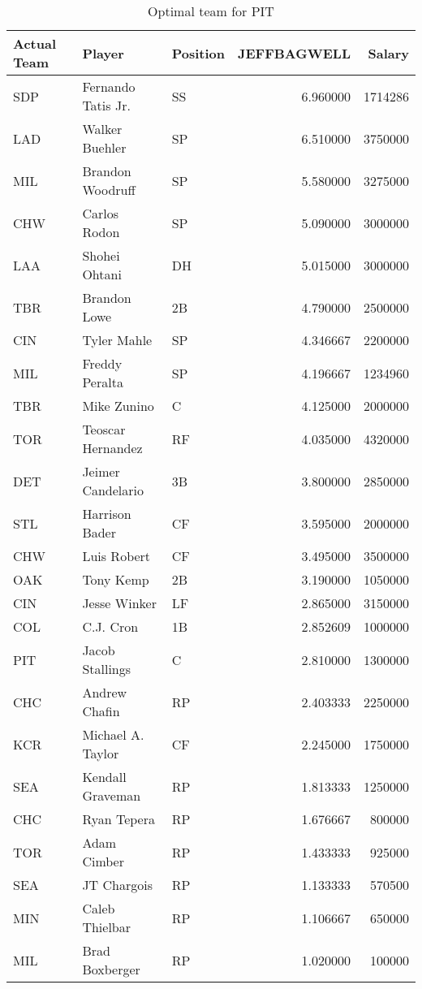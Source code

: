 \begin{table}

\caption{Optimal team for PIT}
\centering
\begin{tabular}[t]{l|l|l|r|r}
\hline
Actual Team & Player & Position & JEFFBAGWELL & Salary\\
\hline
SDP & Fernando Tatis Jr. & SS & 6.960000 & 1714286\\
\hline
LAD & Walker Buehler & SP & 6.510000 & 3750000\\
\hline
MIL & Brandon Woodruff & SP & 5.580000 & 3275000\\
\hline
CHW & Carlos Rodon & SP & 5.090000 & 3000000\\
\hline
LAA & Shohei Ohtani & DH & 5.015000 & 3000000\\
\hline
TBR & Brandon Lowe & 2B & 4.790000 & 2500000\\
\hline
CIN & Tyler Mahle & SP & 4.346667 & 2200000\\
\hline
MIL & Freddy Peralta & SP & 4.196667 & 1234960\\
\hline
TBR & Mike Zunino & C & 4.125000 & 2000000\\
\hline
TOR & Teoscar Hernandez & RF & 4.035000 & 4320000\\
\hline
DET & Jeimer Candelario & 3B & 3.800000 & 2850000\\
\hline
STL & Harrison Bader & CF & 3.595000 & 2000000\\
\hline
CHW & Luis Robert & CF & 3.495000 & 3500000\\
\hline
OAK & Tony Kemp & 2B & 3.190000 & 1050000\\
\hline
CIN & Jesse Winker & LF & 2.865000 & 3150000\\
\hline
COL & C.J. Cron & 1B & 2.852609 & 1000000\\
\hline
PIT & Jacob Stallings & C & 2.810000 & 1300000\\
\hline
CHC & Andrew Chafin & RP & 2.403333 & 2250000\\
\hline
KCR & Michael A. Taylor & CF & 2.245000 & 1750000\\
\hline
SEA & Kendall Graveman & RP & 1.813333 & 1250000\\
\hline
CHC & Ryan Tepera & RP & 1.676667 & 800000\\
\hline
TOR & Adam Cimber & RP & 1.433333 & 925000\\
\hline
SEA & JT Chargois & RP & 1.133333 & 570500\\
\hline
MIN & Caleb Thielbar & RP & 1.106667 & 650000\\
\hline
MIL & Brad Boxberger & RP & 1.020000 & 100000\\
\hline
\end{tabular}
\end{table}
